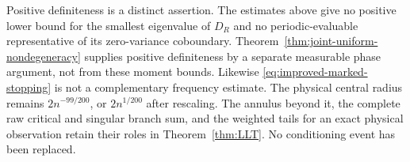 Positive definiteness is a distinct assertion. The estimates above give
no positive lower bound for the smallest eigenvalue of $D_R$ and no
periodic-evaluable representative of its zero-variance coboundary.
Theorem~\ref{thm:joint-uniform-nondegeneracy} supplies positive
definiteness by a separate measurable phase argument, not from these
moment bounds. Likewise \eqref{eq:improved-marked-stopping} is not a complementary
frequency estimate. The physical central radius remains
$2n^{-99/200}$, or $2n^{1/200}$ after rescaling. The annulus beyond it,
the complete raw critical and singular branch sum, and the weighted
tails for an exact physical observation retain their roles in
Theorem~\ref{thm:LLT}. No conditioning event has been replaced.
